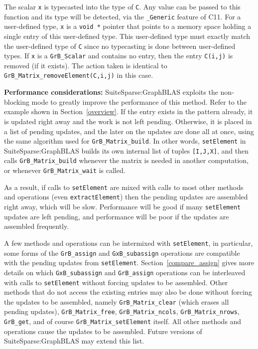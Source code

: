 \documentclass[12pt]{article}
\begin{document}
The scalar \verb'x' is typecasted into the type of \verb'C'.  Any value can be
passed to this function and its type will be detected, via the \verb'_Generic'
feature of C11.  For a user-defined type, \verb'x' is a \verb'void *'
pointer that points to a memory space holding a single entry of this
user-defined type.  This user-defined type must exactly match the user-defined
type of \verb'C' since no typecasting is done between user-defined types.
%
If \verb'x' is a \verb'GrB_Scalar' and contains no entry, then the
entry \verb'C(i,j)' is removed (if it exists).  The action taken is
identical to \verb'GrB_Matrix_removeElement(C,i,j)' in this case.

{\bf Performance considerations:} %
SuiteSparse:GraphBLAS exploits the non-blocking mode to greatly improve the
performance of this method.  Refer to the example shown in
Section~\ref{overview}.  If the entry exists in the pattern already, it is
updated right away and the work is not left pending.  Otherwise, it is placed
in a list of pending updates, and the later on the updates are done all at
once, using the same algorithm used for \verb'GrB_Matrix_build'.  In other
words, \verb'setElement' in SuiteSparse:GraphBLAS builds its own internal list
of tuples \verb'[I,J,X]', and then calls \verb'GrB_Matrix_build' whenever the
matrix is needed in another computation, or whenever \verb'GrB_Matrix_wait' is
called.

As a result, if calls to \verb'setElement' are mixed with calls to most other
methods and operations (even \verb'extractElement') then the pending updates
are assembled right away, which will be slow.  Performance will be good if many
\verb'setElement' updates are left pending, and performance will be poor if the
updates are assembled frequently.

A few methods and operations can be intermixed with \verb'setElement', in
particular, some forms of the \verb'GrB_assign' and \verb'GxB_subassign'
operations are compatible with the pending updates from \verb'setElement'.
Section~\ref{compare_assign} gives more details on which \verb'GxB_subassign'
and \verb'GrB_assign' operations can be interleaved with calls to
\verb'setElement' without forcing updates to be assembled.  Other methods that
do not access the existing entries may also be done without forcing the updates
to be assembled, namely \verb'GrB_Matrix_clear' (which erases all pending
updates), \verb'GrB_Matrix_free', \verb'GrB_Matrix_ncols',
\verb'GrB_Matrix_nrows', \verb'GrB_get', and of course
\verb'GrB_Matrix_setElement' itself.  All other methods and operations cause
the updates to be assembled.  Future versions of SuiteSparse:GraphBLAS may
extend this list.
\end{document}
